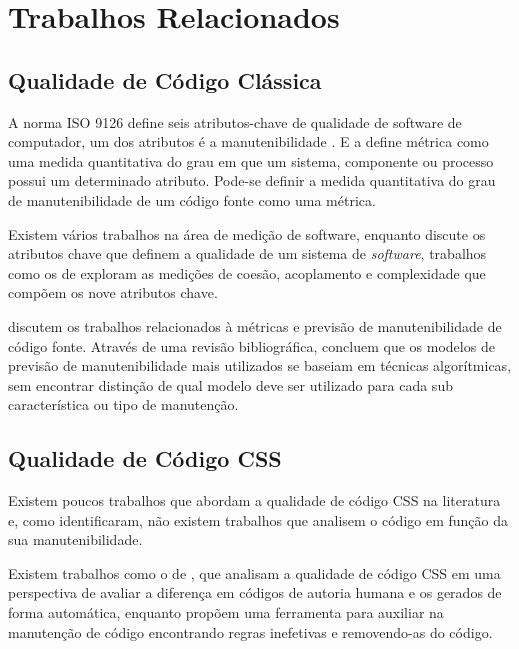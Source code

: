 %
%

\chapter{Trabalhos Relacionados}

\section{Qualidade de Código Clássica}

A norma ISO 9126 define seis atributos-chave de qualidade de software de computador, um dos atributos é a manutenibilidade \cite{Pressman:2010}. E a  define métrica como uma medida quantitativa do grau em que um sistema, componente ou processo possui um determinado atributo. Pode-se definir a medida quantitativa do grau de manutenibilidade de um código fonte como uma métrica.

Existem vários trabalhos na área de medição de software, enquanto  discute os atributos chave que definem a qualidade de um sistema de \textit{software}, trabalhos como os de  exploram as medições de coesão, acoplamento e complexidade que compõem os nove atributos chave.

 discutem os trabalhos relacionados à métricas e previsão de manutenibilidade de código fonte. Através de uma revisão bibliográfica, concluem que os modelos de previsão de manutenibilidade mais utilizados se baseiam em técnicas algorítmicas, sem encontrar distinção de qual modelo deve ser utilizado para cada sub característica ou tipo de manutenção.

\section{Qualidade de Código CSS}

Existem poucos trabalhos que abordam a qualidade de código CSS na literatura e, como  identificaram, não existem trabalhos que analisem o código em função da sua manutenibilidade.

Existem trabalhos como o de , que analisam a qualidade de código CSS em uma perspectiva de avaliar a diferença em códigos de autoria humana e os gerados de forma automática, enquanto  propõem uma ferramenta para auxiliar na manutenção de código encontrando regras inefetivas e removendo-as do código.


